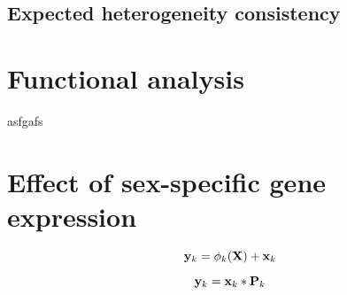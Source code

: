 \subsection{Expected heterogeneity consistency}

\section{Functional analysis}
asfgafs

\section{Effect of sex-specific gene expression}



\begin{equation}
{\bf y}_k = \phi_k ( {\bf X}) + {\bf x}_k 
\label{eq:prn}
\end{equation}


\begin{equation}
{\bf y}_k = {\bf x}_k * {\bf P}_k
\end{equation}

























